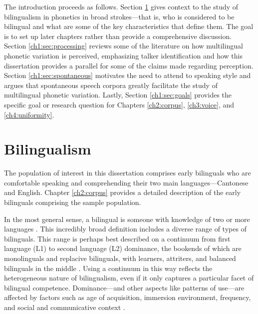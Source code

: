 The introduction proceeds as follows. Section \ref{ch1:sec:bilingualism} gives context to the study of bilingualism in phonetics in broad strokes---that is, who is considered to be bilingual and what are some of the key characteristics that define them. The goal is to set up later chapters rather than provide a comprehensive discussion. Section \ref{ch1:sec:processing} reviews some of the literature on how multilingual phonetic variation is perceived, emphasizing talker identification and how this dissertation provides a parallel for some of the claims made regarding perception. Section \ref{ch1:sec:spontaneous} motivates the need to attend to speaking style and argues that spontaneous speech corpora greatly facilitate the study of multilingual phonetic variation. Lastly, Section \ref{ch1:sec:goals} provides the specific goal or research question for Chapters \ref{ch2:corpus}, \ref{ch3:voice}, and \ref{ch4:uniformity}.

\section{Bilingualism}\label{ch1:sec:bilingualism}

The population of interest in this dissertation comprises early bilinguals who are comfortable speaking and comprehending their two main languages---Cantonese and English. Chapter \ref{ch2:corpus} provides a detailed description of the early bilinguals comprising the sample population. 

In the most general sense, a bilingual is someone with knowledge of two or more languages \citep{grosjean_1989_bilingual}. This incredibly broad definition includes a diverse range of types of bilinguals. This range is perhaps best described on a continuum from first language (L1) to second language (L2) dominance, the bookends of which are monolinguals and replacive bilinguals, with learners, attriters, and balanced bilinguals in the middle \citep{gertken_2014_blp}. Using a continuum in this way reflects the heterogeneous nature of bilingualism, even if it only captures a particular facet of bilingual competence. Dominance---and other aspects like patterns of use---are affected by factors such as age of acquisition, immersion environment, frequency, and social and communicative context \citep{gertken_2014_blp, marian_2021_measuring}. 

